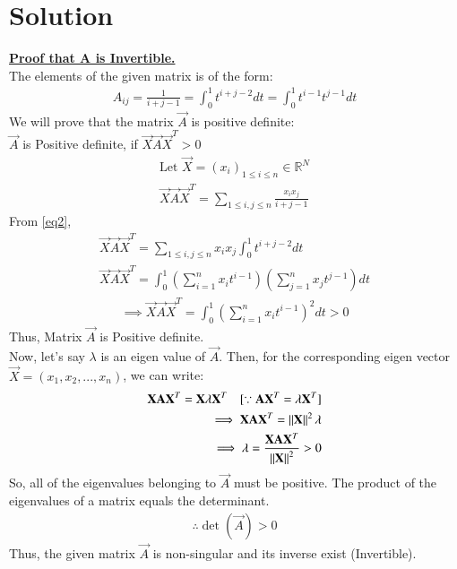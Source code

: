 \documentclass[journal,12pt,twocolumn]{IEEEtran}
\begin{document}
\section{Solution}
\underline{\textbf{Proof that A is Invertible.}}\\
The elements of the given matrix is of the form:
\begin{align}
    A_{ij} = \frac{1}{i+j-1}= \int_{0}^{1}t^{i+j-2}dt= \int_{0}^{1}t^{i-1}t^{j-1}dt \label{eq2}
\end{align}
We will prove that the matrix $\vec{A}$ is positive definite:\\
$\vec{A}$ is Positive definite, if $\vec{X}\Vec{A}\vec{X}^T>0$
\begin{align}
   \text{Let } \vec{X}=(x_i)_{1\leq i\leq n} \in \mathbb{R}^N\\
   \vec{X}\Vec{A}\vec{X}^T=\sum_{1\leq i,j\leq n}\frac{x_ix_j}{i+j-1}
\end{align}
From \eqref{eq2},
\begin{align}
   \vec{X}\Vec{A}\vec{X}^T=\sum_{1\leq i,j\leq n}x_ix_j\int_0^1t^{i+j-2}dt\\
   \vec{X}\Vec{A}\vec{X}^T=\int_0^1\left(\sum_{i=1}^nx_it^{i-1}\right)\left(\sum_{j=1}^nx_jt^{j-1}\right)dt
\end{align}
\begin{align}
       \implies \vec{X}\Vec{A}\vec{X}^T=\int_0^1\left(\sum_{i=1}^nx_it^{i-1}\right)^2dt>0
\end{align}
Thus, Matrix $\vec{A}$ is Positive definite. \\
Now, let's say $\lambda$ is an eigen value of $\vec{A}$. Then, for the corresponding eigen vector $\vec{X}=(x_1,x_2,...,x_n)$, we can write:
\begin{align}
       \vec{X}\Vec{A}\vec{X}^T=\vec{X}\lambda\vec{X}^T \quad [\because  \Vec{A}\vec{X}^T=\lambda\vec{X}^T]\\
       \implies \vec{X}\Vec{A}\vec{X}^T=\norm{\vec{X}}^2\lambda\\
       \implies \lambda=\frac{\vec{X}\Vec{A}\vec{X}^T}{\norm{\vec{X}}^2}>0
\end{align}
So, all of the eigenvalues belonging to  $\vec{A}$ must be positive. The product of the eigenvalues of a matrix equals the determinant.
\begin{align}
    \boxed{\therefore \det({\vec{A}})>0}
\end{align}
Thus, the given matrix $\vec{A}$ is non-singular and its inverse exist (Invertible).\\ \\
\end{document}

